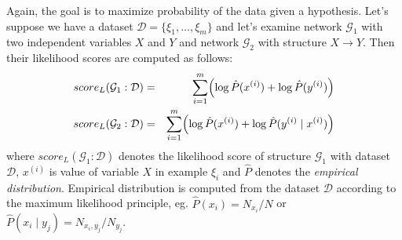 \documentclass[english,cover]{fitthesis} %
\newcommand{\term}[1]{\emph{#1}}           %
\begin{document}
Again, the goal is to maximize probability of the data given a hypothesis. Let's suppose we have a dataset $\mathcal{D} = \lbrace \xi_1, \dots, \xi_m \rbrace$ and let's examine network $\mathcal{G}_1$ with two independent variables $X$ and $Y$ and network $\mathcal{G}_2$ with structure $X \rightarrow Y$. Then their likelihood scores are computed as follows:
\begin{eqnarray*}
    score_L(\mathcal{G}_1 : \mathcal{D}) & = & \sum_{i=1}^m \Bigl(\log \hat P(x^{(i)}) + \log \hat P(y^{(i)})\Bigr)\\
    score_L(\mathcal{G}_2 : \mathcal{D}) & = & \sum_{i=1}^m \Bigl(\log \hat P(x^{(i)}) + \log \hat P(y^{(i)} \mid x^{(i)})\Bigr)
\end{eqnarray*}
where $score_L(\mathcal{G}_1 : \mathcal{D})$ denotes the likelihood score of structure $\mathcal{G}_1$ with dataset $\mathcal{D}$, $x^{(i)}$ is value of variable $X$ in example $\xi_i$ and $\hat P$ denotes the \term{empirical distribution}. Empirical distribution is computed from the dataset $\mathcal{D}$ according to the maximum likelihood principle, eg. $\hat P(x_i) = N_{x_i} / N$ or $\hat P(x_i \mid y_j) = N_{x_i,y_j} / N_{y_j}$.
\end{document}
